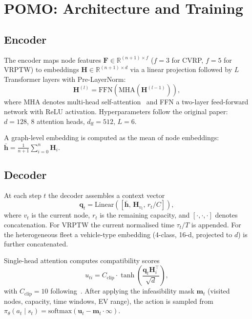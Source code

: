 \documentclass[conference]{IEEEtran}
\begin{document}
\section{POMO: Architecture and Training}

\subsection{Encoder}

The encoder maps node features $\mathbf{F} \in \mathbb{R}^{(n+1)\times f}$
($f=3$ for CVRP, $f=5$ for VRPTW) to embeddings
$\mathbf{H} \in \mathbb{R}^{(n+1)\times d}$ via a linear projection followed
by $L$ Transformer layers with Pre-LayerNorm:
\begin{equation}
  \mathbf{H}^{(l)} = \text{FFN}\!\left(\text{MHA}\!\left(\mathbf{H}^{(l-1)}\right)\right),
\end{equation}
where MHA denotes multi-head self-attention~\cite{vaswani2017attention} and
FFN a two-layer feed-forward network with ReLU activation. Hyperparameters
follow the original paper: $d=128$, 8 attention heads, $d_\text{ff}=512$,
$L=6$.

A graph-level embedding is computed as the mean of node embeddings:
$\bar{\mathbf{h}} = \frac{1}{n+1}\sum_{i=0}^n \mathbf{H}_i$.

\subsection{Decoder}

At each step $t$ the decoder assembles a context vector
\begin{equation}
  \mathbf{q}_t = \text{Linear}\!\left(\left[\bar{\mathbf{h}},\,
  \mathbf{H}_{v_t},\, r_t / C\right]\right),
\end{equation}
where $v_t$ is the current node, $r_t$ is the remaining capacity, and
$[\cdot,\cdot,\cdot]$ denotes concatenation. For VRPTW the current
normalised time $\tau_t / T$ is appended. For the heterogeneous fleet a
vehicle-type embedding (4-class, 16-d, projected to $d$) is further
concatenated.

Single-head attention computes compatibility scores
\begin{equation}
  u_{ti} = C_{\text{clip}} \cdot \tanh\!\left(
    \frac{\mathbf{q}_t \mathbf{H}_i^\top}{\sqrt{d}}
  \right),
\end{equation}
with $C_{\text{clip}}=10$ following~\cite{kwon2020pomo}. After applying the
infeasibility mask $\mathbf{m}_t$ (visited nodes, capacity, time windows,
EV range), the action is sampled from
$\pi_\theta(a_t \mid s_t) = \text{softmax}(\mathbf{u}_t - \mathbf{m}_t \cdot
\infty)$.
\end{document}
